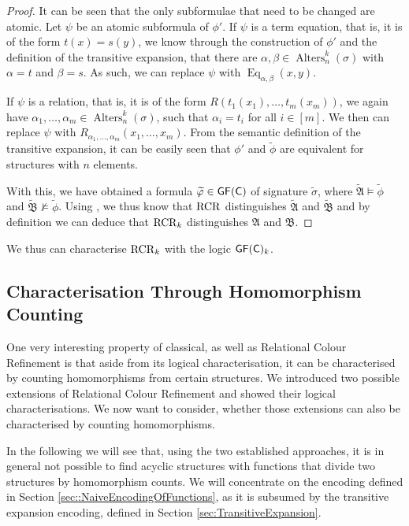 \begin{proof}
	It can be seen that the only subformulae that need to be changed are atomic.
	Let $\psi$ be an atomic subformula of $\phi'$.
	If $\psi$ is a term equation, that is, it is of the form $t(x)=s(y)$, we know through the construction of $\phi'$ and the definition of the transitive expansion, that there are $\alpha,\beta\in \operatorname{Alters}^k_n(\sigma)$ with $\alpha=t$ and $\beta=s$. 
	As such, we can replace $\psi$ with $\operatorname{Eq}_{\alpha,\beta}(x,y)$.
	
	If $\psi$ is a relation, that is, it is of the form $R(t_1(x_1),\dots,t_m(x_m))$, we again have $\alpha_1,\dots,\alpha_m\in \operatorname{Alters}^k_n(\sigma)$, such that $\alpha_i=t_i$ for all $i\in[m]$.
	We then can replace $\psi$ with $R_{\alpha_1,\dots,\alpha_m}(x_1,\dots,x_m)$.
	From the semantic definition of the transitive expansion, it can be easily seen that $\phi'$ and $\widetilde{\phi}$ are equivalent for structures with $n$ elements.
	
	With this, we have obtained a formula $\widetilde{\varphi}\in\mathsf{GF}(\mathsf{C})$ of signature $\widetilde{\sigma}$, where $\widetilde{\mathfrak A}\models \widetilde{\phi}$ and $\widetilde{\mathfrak B}\not\models \widetilde{\phi}$.
	Using \cite{scheidt2025ColorRefinement}, we thus know that $\operatorname{RCR}$ distinguishes $\widetilde{\mathfrak A}$ and $\widetilde{\mathfrak B}$ and by definition we can deduce that $\operatorname{RCR}_k$ distinguishes $\mathfrak A$ and $\mathfrak B$.
\end{proof}

We thus can characterise $\operatorname{RCR}_k$ with the logic $\mathsf{GF}(\mathsf{C})_k$.

\subsection{Characterisation Through Homomorphism Counting}
\label{sec:RCRwithFnHomCount}

One very interesting property of classical, as well as Relational Colour Refinement is that aside from its logical characterisation, it can be characterised by counting homomorphisms from certain structures.
We introduced two possible extensions of Relational Colour Refinement and showed their logical characterisations.
We now want to consider, whether those extensions can also be characterised by counting homomorphisms.

In the following we will see that, using the two established approaches, it is in general not possible to find acyclic structures with functions that divide two structures by homomorphism counts.
We will concentrate on the encoding defined in Section \ref{sec::NaiveEncodingOfFunctions}, as it is subsumed by the transitive expansion encoding, defined in Section \ref{sec:TransitiveExpansion}. 

